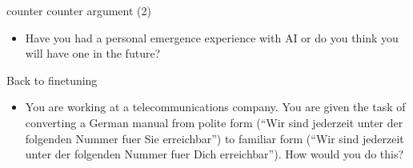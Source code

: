 \begin{frame}{counter counter argument (2)}

\vfill

%
\begin{itemize}
\item \ques Have you had a personal emergence experience
  with AI or do you think you will have one in the future?



%
\end{itemize}


\vfill

\end{frame}

\begin{frame}{Back to finetuning}

\vfill

%
\begin{itemize}
\item \ques You are working at a telecommunications
company. You are given the task of converting a German manual from
polite form (``Wir sind jederzeit unter der folgenden
Nummer fuer Sie erreichbar'') to familiar form
(``Wir sind jederzeit unter der folgenden
Nummer fuer Dich erreichbar''). How would you do this?

\end{itemize}


\vfill

\end{frame}






